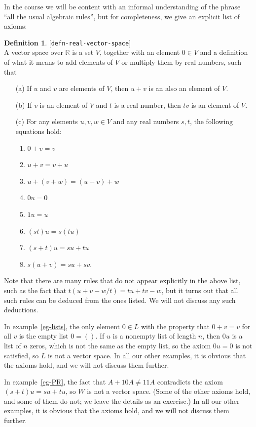 \documentclass{amsart}
\newcommand{\lbl}[1]{\label{#1}\textup{[\texttt{#1}]}\ \\}
\newcommand{\lbl}{\label}
\newcommand{\R}         {{\mathbb{R}}}
\renewcommand{\:}       {\colon}
\theoremstyle{definition}
\newtheorem{definition}[theorem]{Definition}
\begin{document}
In the course we will be content with an informal
understanding of the phrase ``all the usual algebraic
rules'', but for completeness, we give an explicit list of
axioms:
\begin{definition}\lbl{defn-real-vector-space}
 A vector space over $\R$ is a set $V$, together with an
 element $0\in V$ and a definition of what it means to add
 elements of $V$ or multiply them by real numbers, such that
 \begin{itemize} 
  \item[(a)] If $u$ and $v$ are elements of $V$, then $u+v$
   is an also an element of $V$.
  \item[(b)] If $v$ is an element of $V$ and $t$ is a real
   number, then $tv$ is an element of $V$.
  \item[(c)] For any elements $u,v,w\in V$ and any real
   numbers $s,t$, the following equations hold:
    \begin{enumerate}
     \item $0+v=v$
     \item $u+v=v+u$
     \item $u+(v+w)=(u+v)+w$
     \item $0u=0$
     \item $1u=u$
     \item $(st)u=s(tu)$
     \item $(s+t)u=su+tu$
     \item $s(u+v)=su+sv$.
    \end{enumerate}
 \end{itemize}  
\end{definition}
Note that there are many rules that do not appear explicitly
in the above list, such as the fact that
$t(u+v-w/t)=tu+tv-w$, but it turns out that all such rules
can be deduced from the ones listed.  We will not discuss
any such deductions.

In example~\ref{eg-lists}, the only element $0\in L$ with
the property that $0+v=v$ for all $v$ is the empty list
$0=()$.  If $u$ is a nonempty list of length $n$, then $0u$
is a list of $n$ zeros, which is not the same as the empty
list, so the axiom $0u=0$ is not satisfied, so $L$ is not a
vector space.  In all our other examples, it is obvious that
the axioms hold, and we will not discuss them further.

In example~\ref{eg-PR}, the fact that $A+10A\neq 11A$
contradicts the axiom $(s+t)u=su+tu$, so $W$ is not a vector
space.  (Some of the other axioms hold, and some of them do
not; we leave the details as an exercise.)  In all our other
examples, it is obvious that the axioms hold, and we will
not discuss them further.
\end{document}
